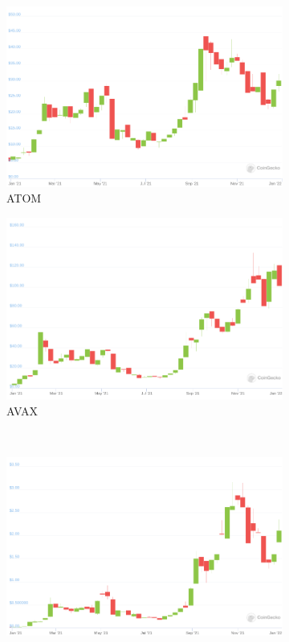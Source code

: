\documentclass[11pt]{article}
\begin{document}
\begin{figure}
     \centering
     \begin{subfigure}[b]{0.4\textwidth}
         \centering
         \includegraphics[width=\textwidth]{figures/atom2021.png}
         \caption{ATOM}
         \label{atom2021}
     \end{subfigure}
     \hfill
     \begin{subfigure}[b]{0.4\textwidth}
         \centering
         \includegraphics[width=\textwidth]{figures/avax2021.png}
         \caption{AVAX}
         \label{avax2021}
     \end{subfigure} 
     \hfill \\
     \begin{subfigure}[b]{0.4\textwidth}
         \centering
         \includegraphics[width=\textwidth]{figures/ftm2021.png}

\end{subfigure}
\end{figure}
\end{document}
